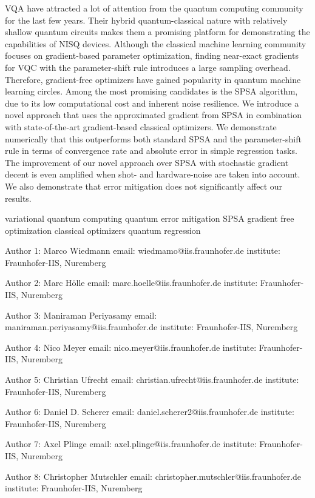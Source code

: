 

VQA have attracted a lot of attention from the quantum computing community for the last few years. Their hybrid quantum-classical nature with relatively shallow quantum circuits makes them a promising platform for demonstrating the capabilities of NISQ devices. Although the classical machine learning community focuses on gradient-based parameter optimization, finding near-exact gradients for VQC with the parameter-shift rule introduces a large sampling overhead. Therefore, gradient-free optimizers have gained popularity in quantum machine learning circles. Among the most promising candidates is the SPSA algorithm, due to its low computational cost and inherent noise resilience. We introduce a novel approach that uses the approximated gradient from SPSA in combination with state-of-the-art gradient-based classical optimizers. We demonstrate numerically that this outperforms both standard SPSA and the parameter-shift rule in terms of convergence rate and absolute error in simple regression tasks. The improvement of our novel approach over SPSA with stochastic gradient decent is even amplified when shot- and hardware-noise are taken into account. We also demonstrate that error mitigation does not significantly affect our results.


variational quantum computing
 quantum error mitigation 
 SPSA
 gradient free optimization 
 classical optimizers 
 quantum regression


Author 1: Marco Wiedmann
email: wiedmamo@iis.fraunhofer.de
institute: Fraunhofer-IIS, Nuremberg

Author 2: Marc Hölle
email: marc.hoelle@iis.fraunhofer.de
institute: Fraunhofer-IIS, Nuremberg

Author 3: Maniraman Periyasamy
email: maniraman.periyasamy@iis.fraunhofer.de
institute: Fraunhofer-IIS, Nuremberg

Author 4: Nico Meyer
email: nico.meyer@iis.fraunhofer.de
institute: Fraunhofer-IIS, Nuremberg

Author 5: Christian Ufrecht
email: christian.ufrecht@iis.fraunhofer.de
institute: Fraunhofer-IIS, Nuremberg

Author 6: Daniel D. Scherer
email: daniel.scherer2@iis.fraunhofer.de
institute: Fraunhofer-IIS, Nuremberg

Author 7: Axel Plinge
email: axel.plinge@iis.fraunhofer.de
institute: Fraunhofer-IIS, Nuremberg

Author 8: Christopher Mutschler
email: christopher.mutschler@iis.fraunhofer.de
institute: Fraunhofer-IIS, Nuremberg